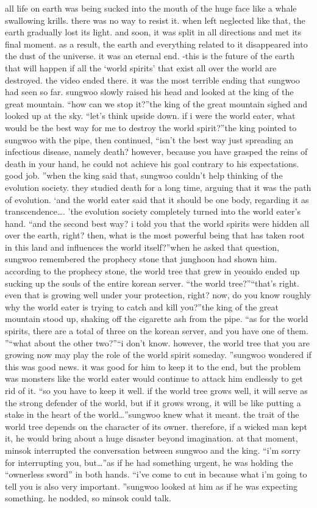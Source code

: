 all life on earth was being sucked into the mouth of the huge face like a whale swallowing krills.
there was no way to resist it.
 when left neglected like that, the earth gradually lost its light.
 and soon, it was split in all directions and met its final moment.
as a result, the earth and everything related to it disappeared into the dust of the universe.
it was an eternal end.
-this is the future of the earth that will happen if all the ‘world spirits’ that exist all over the world are destroyed.
the video ended there.
it was the most terrible ending that sungwoo had seen so far.
sungwoo slowly raised his head and looked at the king of the great mountain.
“how can we stop it?”the king of the great mountain sighed and looked up at the sky.
“let’s think upside down.
 if i were the world eater, what would be the best way for me to destroy the world spirit?”the king pointed to sungwoo with the pipe, then continued, “isn’t the best way just spreading an infectious disease, namely death? however, because you have grasped the reins of death in your hand, he could not achieve his goal contrary to his expectations.
 good job.
”when the king said that, sungwoo couldn’t help thinking of the evolution society.
 they studied death for a long time, arguing that it was the path of evolution.
‘and the world eater said that it should be one body, regarding it as transcendence….
’the evolution society completely turned into the world eater’s hand.
“and the second best way? i told you that the world spirits were hidden all over the earth, right? then, what is the most powerful being that has taken root in this land and influences the world itself?”when he asked that question, sungwoo remembered the prophecy stone that junghoon had shown him.
 according to the prophecy stone, the world tree that grew in yeouido ended up sucking up the souls of the entire korean server.
“the world tree?”“that’s right.
 even that is growing well under your protection, right? now, do you know roughly why the world eater is trying to catch and kill you?”the king of the great mountain stood up, shaking off the cigarette ash from the pipe.
“as for the world spirits, there are a total of three on the korean server, and you have one of them.
”“what about the other two?”“i don’t know.
 however, the world tree that you are growing now may play the role of the world spirit someday.
”sungwoo wondered if this was good news.
 it was good for him to keep it to the end, but the problem was monsters like the world eater would continue to attack him endlessly to get rid of it.
“so you have to keep it well.
 if the world tree grows well, it will serve as the strong defender of the world, but if it grows wrong, it will be like putting a stake in the heart of the world…”sungwoo knew what it meant.
 the trait of the world tree depends on the character of its owner.
 therefore, if a wicked man kept it, he would bring about a huge disaster beyond imagination.
at that moment, minsok interrupted the conversation between sungwoo and the king.
“i’m sorry for interrupting you, but…”as if he had something urgent, he was holding the “ownerless sword” in both hands.
“i’ve come to cut in because what i’m going to tell you is also very important.
”sungwoo looked at him as if he was expecting something.
 he nodded, so minsok could talk.


